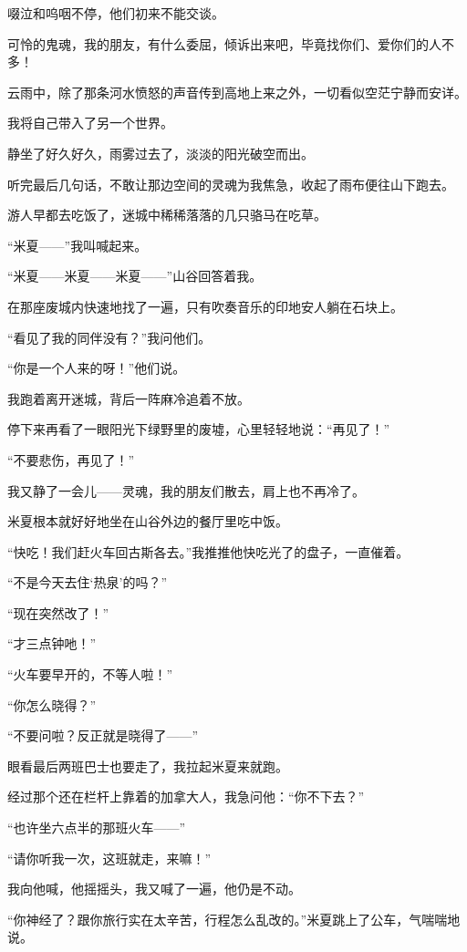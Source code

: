 \par 啜泣和呜咽不停，他们初来不能交谈。
\par 可怜的鬼魂，我的朋友，有什么委屈，倾诉出来吧，毕竟找你们、爱你们的人不多！
\par 云雨中，除了那条河水愤怒的声音传到高地上来之外，一切看似空茫宁静而安详。
\par 我将自己带入了另一个世界。
\par 静坐了好久好久，雨雾过去了，淡淡的阳光破空而出。
\par 听完最后几句话，不敢让那边空间的灵魂为我焦急，收起了雨布便往山下跑去。
\par 游人早都去吃饭了，迷城中稀稀落落的几只骆马在吃草。
\par “米夏——”我叫喊起来。
\par “米夏——米夏——米夏——”山谷回答着我。
\par 在那座废城内快速地找了一遍，只有吹奏音乐的印地安人躺在石块上。
\par “看见了我的同伴没有？”我问他们。
\par “你是一个人来的呀！”他们说。
\par 我跑着离开迷城，背后一阵麻冷追着不放。
\par 停下来再看了一眼阳光下绿野里的废墟，心里轻轻地说：“再见了！”
\par “不要悲伤，再见了！”
\par 我又静了一会儿——灵魂，我的朋友们散去，肩上也不再冷了。
\par 米夏根本就好好地坐在山谷外边的餐厅里吃中饭。
\par “快吃！我们赶火车回古斯各去。”我推推他快吃光了的盘子，一直催着。
\par “不是今天去住‘热泉’的吗？”
\par “现在突然改了！”
\par “才三点钟吔！”
\par “火车要早开的，不等人啦！”
\par “你怎么晓得？”
\par “不要问啦？反正就是晓得了——”
\par 眼看最后两班巴士也要走了，我拉起米夏来就跑。
\par 经过那个还在栏杆上靠着的加拿大人，我急问他：“你不下去？”
\par “也许坐六点半的那班火车——”
\par “请你听我一次，这班就走，来嘛！”
\par 我向他喊，他摇摇头，我又喊了一遍，他仍是不动。
\par “你神经了？跟你旅行实在太辛苦，行程怎么乱改的。”米夏跳上了公车，气喘喘地说。
